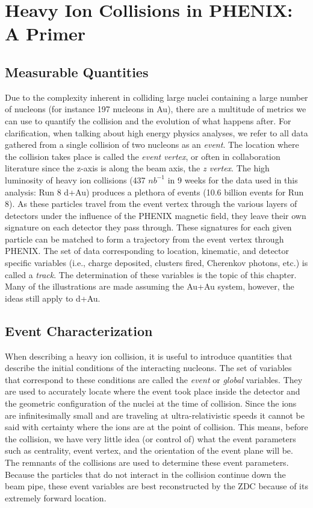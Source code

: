 \chapter{Heavy Ion Collisions in PHENIX: A Primer} %
\label{hicollisions}
\section{Measurable Quantities}
Due to the complexity inherent in colliding large nuclei containing a large number of nucleons (for instance 197 nucleons in Au), there are a multitude of metrics we can use to quantify the collision and the evolution of what happens after. For clarification, when talking about high energy physics analyses, we refer to all data gathered from a single collision of two nucleons as an \textit{event}. The location where the collision takes place is called the \textit{event vertex}, or often in collaboration literature since the z-axis is along the beam axis, the \textit{z vertex}. The high luminosity of heavy ion collisions (437 $nb^{-1}$ in 9 weeks for the data used in this analysis: Run 8 d+Au) produces a plethora of events (10.6 billion events for Run 8). As these particles travel from the event vertex through the various layers of detectors under the influence of the PHENIX magnetic field, they leave their own signature on each detector they pass through. These signatures for each given particle can be matched to form a trajectory from the event vertex through PHENIX. The set of data corresponding to location, kinematic, and detector specific variables (i.e., charge deposited, clusters fired, Cherenkov photons, etc.) is called a \textit{track}. The determination of these variables is the topic of this chapter. Many of the illustrations are made assuming the Au+Au system, however, the ideas still apply to d+Au.

\section{Event Characterization}
When describing a heavy ion collision, it is useful to introduce quantities that describe the initial conditions of the interacting nucleons. The set of variables that correspond to these conditions are called the \textit{event} or \textit{global} variables. They are used to accurately locate where the event took place inside the detector and the geometric configuration of the nuclei at the time of collision. Since the ions are infinitesimally small and are traveling at ultra-relativistic speeds it cannot be said with certainty where the ions are at the point of collision. This means, before the collision, we have very little idea (or control of) what the event parameters such as centrality, event vertex, and the orientation of the event plane will be. The remnants of the collisions are used to determine these event parameters. Because the particles that do not interact in the collision continue down the beam pipe, these event variables are best reconstructed by the ZDC because of its extremely forward location. 

